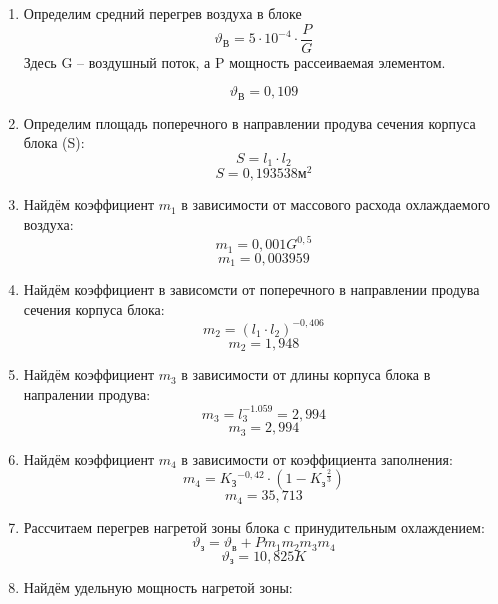 \begin{enumerate}[label={\arabic*.}]
\item Определим средний перегрев воздуха в блоке
  \begin{equation}
    \vartheta\mathrm{_В} = 5 \cdot 10^{-4} \cdot \frac{P}{G}
  \end{equation}
Здесь G – воздушный поток, а P мощность рассеиваемая элементом.

$$\vartheta\mathrm{_В} = 0,109$$

\item Определим площадь поперечного в направлении продува сечения
корпуса блока (S):
\begin{equation}
  S = l_1 \cdot l_2
\end{equation}
$$S = 0,193538\mathrm{м^2}$$

\item Найдём коэффициент $m_1$ в зависимости от массового расхода
  охлаждаемого воздуха:
  \begin{equation}
    m_1 = 0,001G^{0,5} 
  \end{equation}
  $$m_1 = 0,003959$$

  \item Найдём коэффициент в зависомсти от поперечного в направлении
    продува сечения корпуса блока:
    \begin{equation}
      m_2 = (l_1 \cdot l_2) ^ {-0,406}
    \end{equation}
    $$m_2 = 1,948$$

    \item Найдём коэффициент $m_3$ в зависимости от длины корпуса блока
      в напралении продува:
      \begin{equation}
      m_3 = l_3 ^ {-1.059}= 2,994  
    \end{equation}
    $$m_3= 2,994$$

  \item Найдём коэффициент $m_4$ в зависимости от коэффициента заполнения:
    \begin{equation}
      m_4 = K\mathrm{_З}^{-0,42} \cdot (1 - K\mathrm{_з}^\frac{2}{3})
    \end{equation}
    $$m_4 = 35,713$$

  \item Рассчитаем перегрев нагретой зоны блока с принудительным охлаждением:
    \begin{equation}
      \vartheta\mathrm{_з} = \vartheta\mathrm{_в} + P m_1 m_2 m_3 m_4
    \end{equation}
    $$\vartheta\mathrm{_з} = 10,825K$$
  \item Найдём удельную мощность нагретой зоны:
    

\end{enumerate}
